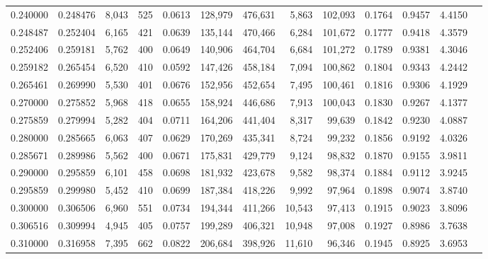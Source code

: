 \begin{tabular}{rrrrrrrrrrrrr}
0.240000 & 0.248476 &  8,043 &   525 &                                     0.0613 & 128,979 & 476,631 &   5,863 & 102,093 & 0.1764 & 0.9457 & 4.4150 \\
0.248487 & 0.252404 &  6,165 &   421 &                                     0.0639 & 135,144 & 470,466 &   6,284 & 101,672 & 0.1777 & 0.9418 & 4.3579 \\
0.252406 & 0.259181 &  5,762 &   400 &                                     0.0649 & 140,906 & 464,704 &   6,684 & 101,272 & 0.1789 & 0.9381 & 4.3046 \\
0.259182 & 0.265454 &  6,520 &   410 &                                     0.0592 & 147,426 & 458,184 &   7,094 & 100,862 & 0.1804 & 0.9343 & 4.2442 \\
0.265461 & 0.269990 &  5,530 &   401 &                                     0.0676 & 152,956 & 452,654 &   7,495 & 100,461 & 0.1816 & 0.9306 & 4.1929 \\
0.270000 & 0.275852 &  5,968 &   418 &                                     0.0655 & 158,924 & 446,686 &   7,913 & 100,043 & 0.1830 & 0.9267 & 4.1377 \\
0.275859 & 0.279994 &  5,282 &   404 &                                     0.0711 & 164,206 & 441,404 &   8,317 &  99,639 & 0.1842 & 0.9230 & 4.0887 \\
0.280000 & 0.285665 &  6,063 &   407 &                                     0.0629 & 170,269 & 435,341 &   8,724 &  99,232 & 0.1856 & 0.9192 & 4.0326 \\
0.285671 & 0.289986 &  5,562 &   400 &                                     0.0671 & 175,831 & 429,779 &   9,124 &  98,832 & 0.1870 & 0.9155 & 3.9811 \\
0.290000 & 0.295859 &  6,101 &   458 &                                     0.0698 & 181,932 & 423,678 &   9,582 &  98,374 & 0.1884 & 0.9112 & 3.9245 \\
0.295859 & 0.299980 &  5,452 &   410 &                                     0.0699 & 187,384 & 418,226 &   9,992 &  97,964 & 0.1898 & 0.9074 & 3.8740 \\
0.300000 & 0.306506 &  6,960 &   551 &                                     0.0734 & 194,344 & 411,266 &  10,543 &  97,413 & 0.1915 & 0.9023 & 3.8096 \\
0.306516 & 0.309994 &  4,945 &   405 &                                     0.0757 & 199,289 & 406,321 &  10,948 &  97,008 & 0.1927 & 0.8986 & 3.7638 \\
0.310000 & 0.316958 &  7,395 &   662 &                                     0.0822 & 206,684 & 398,926 &  11,610 &  96,346 & 0.1945 & 0.8925 & 3.6953 \\

\end{tabular}
